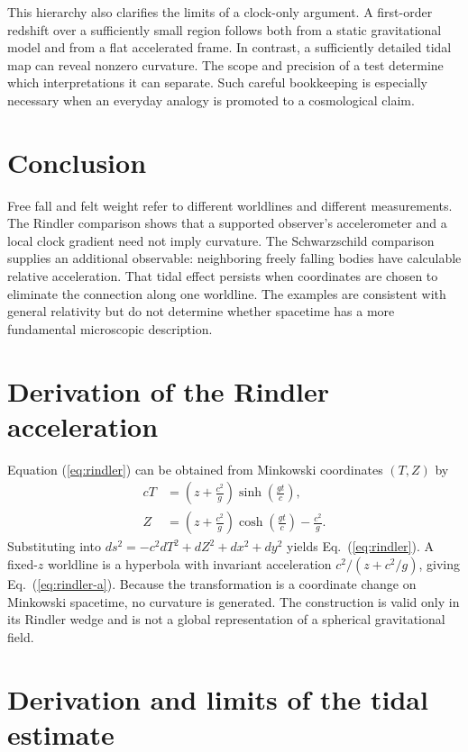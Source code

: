 \documentclass[11pt,letterpaper]{article}
\begin{document}
This hierarchy also clarifies the limits of a clock-only argument. A first-order redshift over a sufficiently small region follows both from a static gravitational model and from a flat accelerated frame. In contrast, a sufficiently detailed tidal map can reveal nonzero curvature. The scope and precision of a test determine which interpretations it can separate. Such careful bookkeeping is especially necessary when an everyday analogy is promoted to a cosmological claim.

\section{Conclusion}

Free fall and felt weight refer to different worldlines and different measurements. The Rindler comparison shows that a supported observer's accelerometer and a local clock gradient need not imply curvature. The Schwarzschild comparison supplies an additional observable: neighboring freely falling bodies have calculable relative acceleration. That tidal effect persists when coordinates are chosen to eliminate the connection along one worldline. The examples are consistent with general relativity but do not determine whether spacetime has a more fundamental microscopic description.

\appendix
\section{Derivation of the Rindler acceleration}

Equation (\ref{eq:rindler}) can be obtained from Minkowski coordinates $(T,Z)$ by
\begin{align}
 cT&=\left(z+\frac{c^2}{g}\right)\sinh\left(\frac{gt}{c}\right),\\
 Z&=\left(z+\frac{c^2}{g}\right)\cosh\left(\frac{gt}{c}\right)-\frac{c^2}{g}.
\end{align}
Substituting into $ds^2=-c^2dT^2+dZ^2+dx^2+dy^2$ yields Eq.~(\ref{eq:rindler}). A fixed-$z$ worldline is a hyperbola with invariant acceleration $c^2/(z+c^2/g)$, giving Eq.~(\ref{eq:rindler-a}). Because the transformation is a coordinate change on Minkowski spacetime, no curvature is generated. The construction is valid only in its Rindler wedge and is not a global representation of a spherical gravitational field.

\section{Derivation and limits of the tidal estimate}
\end{document}
